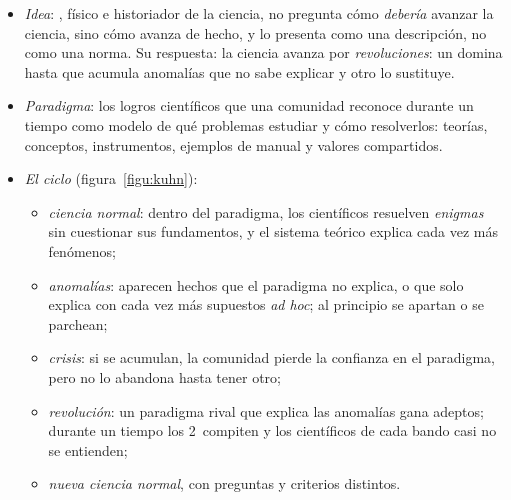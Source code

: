 \documentclass[11pt]{article}
\begin{document}
\begin{itemize}
\item \emph{Idea}: , físico e historiador de la ciencia, no pregunta cómo \emph{debería} avanzar la ciencia, sino cómo avanza de hecho, y lo presenta como una descripción, no como una norma. Su respuesta: la ciencia avanza por \emph{revoluciones}: un  domina hasta que acumula anomalías que no sabe explicar y otro lo sustituye\nocite{Kuhn1962Structure}.
\item \emph{Paradigma}: los logros científicos que una comunidad reconoce durante un tiempo como modelo de qué problemas estudiar y cómo resolverlos: teorías, conceptos, instrumentos, ejemplos de manual y valores compartidos.
\item \emph{El ciclo} (figura~\ref{figu:kuhn}):
  \begin{itemize}
  \item \emph{ciencia normal}: dentro del paradigma, los científicos resuelven \emph{enigmas} sin cuestionar sus fundamentos, y el sistema teórico explica cada vez más fenómenos;
  \item \emph{anomalías}: aparecen hechos que el paradigma no explica, o que solo explica con cada vez más supuestos \emph{ad hoc}; al principio se apartan o se parchean;
  \item \emph{crisis}: si se acumulan, la comunidad pierde la confianza en el paradigma, pero no lo abandona hasta tener otro;
  \item \emph{revolución}: un paradigma rival que explica las anomalías gana adeptos; durante un tiempo los 2~compiten y los científicos de cada bando casi no se entienden;
  \item \emph{nueva ciencia normal}, con preguntas y criterios distintos.
  \end{itemize}
\end{itemize}

\begin{infografia}[H]
\centering
\caption{El ciclo de : ciencia normal, anomalías, crisis y revolución}\label{figu:kuhn}
\end{infografia}
\end{document}
